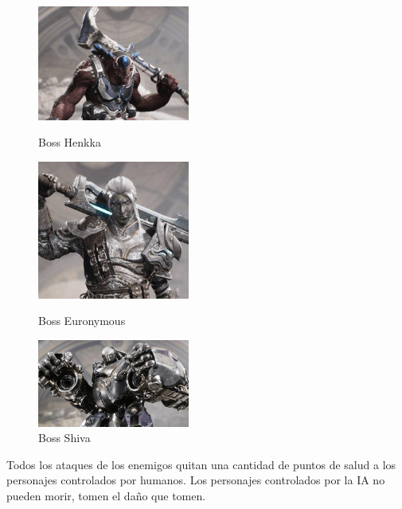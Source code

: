 \begin{itemize}
\begin{figure}[H]
  \begin{minipage}{0.33\textwidth}
    \centering
    \includegraphics[width=5cm]{./images/henkka.jpg}
    \caption{Boss Henkka}
    \label{Henkka}
  \end{minipage}%
  \hspace{0.5mm}
  \begin{minipage}{0.33\textwidth}
    \centering
    \includegraphics[width=5cm]{./images/euronymous.jpg}
    \caption{Boss Euronymous}
    \label{Euronymous}
  \end{minipage}
  \hspace{0.5mm}
  \begin{minipage}{0.33\textwidth}
    \centering
    \includegraphics[width=5cm]{./images/shiva.jpg}
    \caption{Boss Shiva}
    \label{Shiva}
  \end{minipage}
\end{figure}

\begin{greenbox}
\begin{center}
Todos los ataques de los enemigos quitan una cantidad de puntos de salud a los personajes controlados por humanos. Los personajes controlados por la \ac{IA} no pueden morir, tomen el daño que tomen.
\end{center}
\end{greenbox}
\end{itemize}

